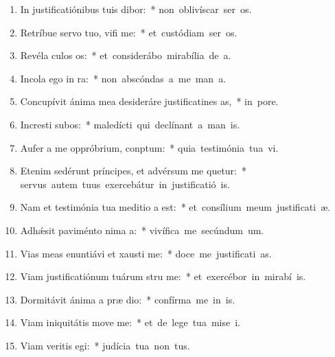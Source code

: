 \begin{flushleft}
\begin{enumerate}[leftmargin=*]
\item In justificatiónibus tuis dibor:~* \mbox{non oblivíscar ser os.}
\item Retríbue servo tuo, vifi me:~* \mbox{et custódiam ser os.}
\item Revéla culos os:~* \mbox{et considerábo mirabília de  a.}
\item Incola ego  in ra:~* \mbox{non abscóndas a me man a.}
\item Concupívit ánima mea desideráre justificatines as,~* \mbox{in  pore.}
\item Incresti subos:~* \mbox{maledícti qui declínant a man is.}
\item Aufer a me oppróbrium,  conptum:~* \mbox{quia testimónia tua vi.}
\item Etenim sedérunt príncipes, et advérsum me quetur:~* \mbox{servus autem tuus exercebátur in justificatió is.}
\item Nam et testimónia tua meditio a est:~* \mbox{et consílium meum justificati æ.}
\item Adh\'{\ae}sit paviménto nima a:~* \mbox{vivífica me secúndum  um.}
\item Vias meas enuntiávi et xausti me:~* \mbox{doce me justificati as.}
\item Viam justificatiónum tuárum stru me:~* \mbox{et exercébor in mirabí is.}
\item Dormitávit ánima a præ dio:~* \mbox{confírma me in  is.}
\item Viam iniquitátis move  me:~* \mbox{et de lege tua mise i.}
\item Viam veritis egi:~* \mbox{judícia tua non  tus.}

\end{enumerate}
\end{flushleft}
